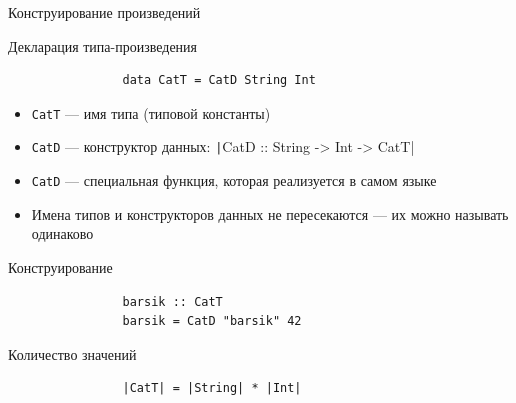     \begin{frame}[fragile]{Конструирование произведений}
        \vspace{-0.5em}
        \begin{block}{Декларация типа-произведения}
            \begin{verbatim}
                data CatT = CatD String Int
            \end{verbatim}
            \pause
            \begin{itemize}
                \item \texttt{CatT} --- имя типа (типовой константы)
                \item \texttt{CatD} --- конструктор данных: \texttt|CatD :: String -> Int -> CatT|
                \item \texttt{CatD} --- специальная функция, которая реализуется в самом языке
                \item Имена типов и конструкторов данных не пересекаются --- их можно называть одинаково
            \end{itemize}
        \end{block}
        \begin{block}{Конструирование}
            \begin{verbatim}
                barsik :: CatT
                barsik = CatD "barsik" 42
            \end{verbatim}
        \end{block}
        \begin{block}{Количество значений}
            \begin{verbatim}
                |CatT| = |String| * |Int|
            \end{verbatim}
        \end{block}
    \end{frame}

